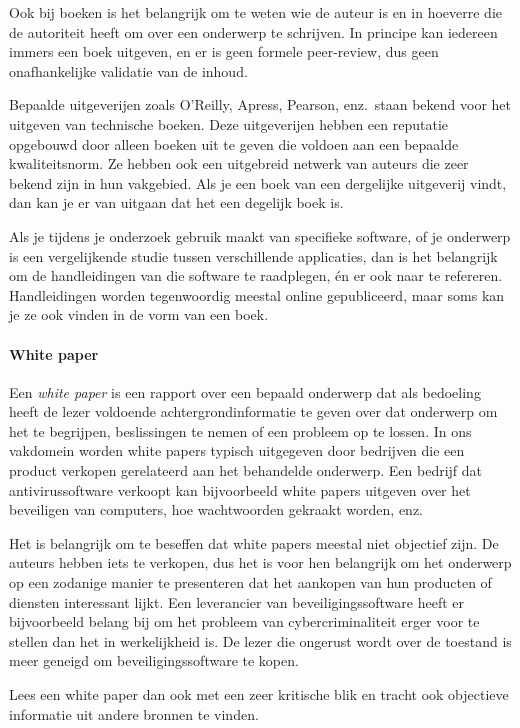 Ook bij boeken is het belangrijk om te weten wie de auteur is en in hoeverre die de autoriteit heeft om over een onderwerp te schrijven. In principe kan iedereen immers een boek uitgeven, en er is geen formele peer-review, dus geen onafhankelijke validatie van de inhoud.

Bepaalde uitgeverijen zoals O'Reilly, Apress, Pearson, enz.\ staan bekend voor het uitgeven van technische boeken. Deze uitgeverijen hebben een reputatie opgebouwd door alleen boeken uit te geven die voldoen aan een bepaalde kwaliteitsnorm. Ze hebben ook een uitgebreid netwerk van auteurs die zeer bekend zijn in hun vakgebied. Als je een boek van een dergelijke uitgeverij vindt, dan kan je er van uitgaan dat het een degelijk boek is.

Als je tijdens je onderzoek gebruik maakt van specifieke software, of je onderwerp is een vergelijkende studie tussen verschillende applicaties, dan is het belangrijk om de handleidingen van die software te raadplegen, én er ook naar te refereren. Handleidingen worden tegenwoordig meestal online gepubliceerd, maar soms kan je ze ook vinden in de vorm van een boek.

\paragraph{White paper}

Een \emph{white paper} is een rapport over een bepaald onderwerp dat als bedoeling heeft de lezer voldoende achtergrondinformatie te geven over dat onderwerp om het te begrijpen, beslissingen te nemen of een probleem op te lossen. In ons vakdomein worden white papers typisch uitgegeven door bedrijven die een product verkopen gerelateerd aan het behandelde onderwerp. Een bedrijf dat antivirussoftware verkoopt kan bijvoorbeeld white papers uitgeven over het beveiligen van computers, hoe wachtwoorden gekraakt worden, enz.

Het is belangrijk om te beseffen dat white papers meestal niet objectief zijn. De auteurs hebben iets te verkopen, dus het is voor hen belangrijk om het onderwerp op een zodanige manier te presenteren dat het aankopen van hun producten of diensten interessant lijkt. Een leverancier van beveiligingssoftware heeft er bijvoorbeeld belang bij om het probleem van cybercriminaliteit erger voor te stellen dan het in werkelijkheid is. De lezer die ongerust wordt over de toestand is meer geneigd om beveiligingssoftware te kopen.

Lees een white paper dan ook met een zeer kritische blik en tracht ook objectieve informatie uit andere bronnen te vinden.

